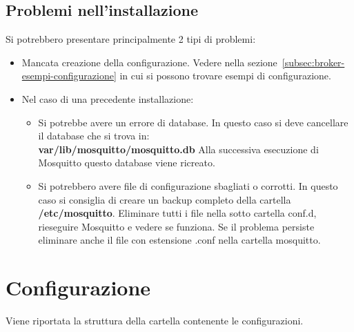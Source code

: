 \subsection{Problemi nell'installazione}
Si potrebbero presentare principalmente 2 tipi di problemi:
\begin{itemize}
    \item Mancata creazione della configurazione.\newline
    Vedere nella sezione~\ref{subsec:broker-esempi-configurazione} in cui si possono trovare esempi di configurazione.
    \item Nel caso di una precedente installazione:
    \begin{itemize}
        \item Si potrebbe avere un errore di database.\newline
        In questo caso si deve cancellare il database che si trova in:\\
        \textbf{var/lib/mosquitto/mosquitto.db} \newline
        Alla successiva esecuzione di Mosquitto questo database viene ricreato.
        \item Si potrebbero avere file di configurazione sbagliati o corrotti.\newline
        In questo caso si consiglia di creare un backup completo della cartella \textbf{/etc/mosquitto}.
        Eliminare tutti i file nella sotto cartella conf.d, rieseguire Mosquitto e vedere se funziona.
        Se il problema persiste eliminare anche il file con estensione .conf nella cartella mosquitto.
    \end{itemize}
\end{itemize}


\section{Configurazione}
\label{sub:broker-configurazione-del-broker}
Viene riportata la struttura della cartella contenente le configurazioni.
~

